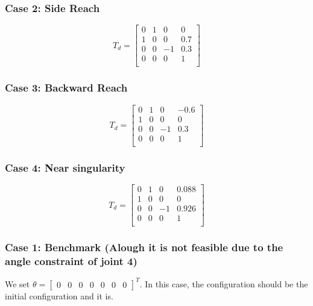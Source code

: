 \documentclass[english,10pt,a4paper]{article}
\begin{document}
    \subsubsection*{Case 2: Side Reach}
    $$T_d = \begin{bmatrix}
    	0 & 1 & 0 & 0\\
    	1 & 0 & 0 & 0.7\\
    	0 & 0 & -1 & 0.3 \\
    	0 & 0 & 0 & 1 \\
    \end{bmatrix}$$
    
    \subsubsection*{Case 3: Backward Reach}
    $$T_d = \begin{bmatrix}
    	0 & 1 & 0 & -0.6\\
    	1 & 0 & 0 & 0\\
    	0 & 0 & -1 & 0.3 \\
    	0 & 0 & 0 & 1 \\
    \end{bmatrix}$$
    
    \subsubsection*{Case 4: Near singularity}
        $$T_d = \begin{bmatrix}
    	0 & 1 & 0 & 0.088\\
    	1 & 0 & 0 & 0\\
    	0 & 0 & -1 & 0.926 \\
    	0 & 0 & 0 & 1 \\
    \end{bmatrix}$$
    
    
    \subsubsection*{Case 1: Benchmark (Alough it is not feasible due to the angle constraint of joint 4)}
    We set $\theta = \begin{bmatrix}
        0 & 0 & 0 & 0 & 0 & 0 & 0
    \end{bmatrix}^T$. In this case, the configuration should be the initial configuration and it is.
\end{document}

